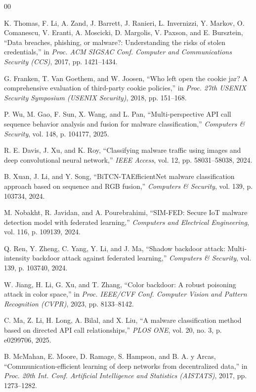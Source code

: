 \documentclass[conference]{IEEEtran}
\begin{document}
\begin{thebibliography}{00}

K. Thomas, F. Li, A. Zand, J. Barrett, J. Ranieri, L. Invernizzi,
Y. Markov, O. Comanescu, V. Eranti, A. Moscicki, D. Margolis,
V. Paxson, and E. Bursztein,
``Data breaches, phishing, or malware?: Understanding the risks of stolen credentials,''
in \emph{Proc. ACM SIGSAC Conf. Computer and Communications Security (CCS)},
2017, pp. 1421--1434.

G. Franken, T. Van Goethem, and W. Joosen,
``Who left open the cookie jar? A comprehensive evaluation of third-party cookie policies,''
in \emph{Proc. 27th USENIX Security Symposium (USENIX Security)},
2018, pp. 151--168.

P. Wu, M. Gao, F. Sun, X. Wang, and L. Pan,
``Multi-perspective API call sequence behavior analysis and fusion for malware classification,''
\emph{Computers \& Security}, vol. 148, p. 104177, 2025.

R. E. Davis, J. Xu, and K. Roy,
``Classifying malware traffic using images and deep convolutional neural network,''
\emph{IEEE Access}, vol. 12, pp. 58031--58038, 2024.

B. Xuan, J. Li, and Y. Song,
``BiTCN-TAEfficientNet malware classification approach based on sequence and RGB fusion,''
\emph{Computers \& Security}, vol. 139, p. 103734, 2024.

M. Nobakht, R. Javidan, and A. Pourebrahimi,
``SIM-FED: Secure IoT malware detection model with federated learning,''
\emph{Computers and Electrical Engineering}, vol. 116, p. 109139, 2024.

Q. Ren, Y. Zheng, C. Yang, Y. Li, and J. Ma,
``Shadow backdoor attack: Multi-intensity backdoor attack against federated learning,''
\emph{Computers \& Security}, vol. 139, p. 103740, 2024.

W. Jiang, H. Li, G. Xu, and T. Zhang,
``Color backdoor: A robust poisoning attack in color space,''
in \emph{Proc. IEEE/CVF Conf. Computer Vision and Pattern Recognition (CVPR)},
2023, pp. 8133--8142.

C. Ma, Z. Li, H. Long, A. Bilal, and X. Liu,
``A malware classification method based on directed API call relationships,''
\emph{PLOS ONE}, vol. 20, no. 3, p. e0299706, 2025.

B. McMahan, E. Moore, D. Ramage, S. Hampson, and B. A. y Arcas,
``Communication-efficient learning of deep networks from decentralized data,''
in \emph{Proc. 20th Int. Conf. Artificial Intelligence and Statistics (AISTATS)},
2017, pp. 1273--1282.


\end{thebibliography}
\end{document}
